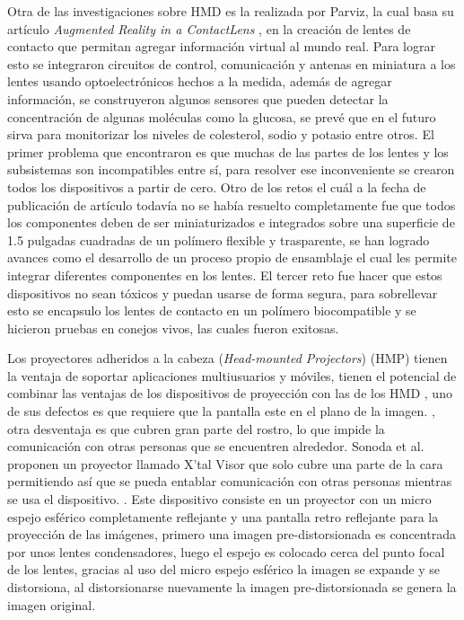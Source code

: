 \documentclass[12pt,a4paper,spanish,openany]{book}
\begin{document}
Otra de las investigaciones sobre HMD es la realizada
por Parviz, la cual basa su artículo \emph{Augmented Reality in a ContactLens}
\cite{arcl}, en la creación de lentes de contacto que permitan agregar
información virtual al mundo real. Para lograr esto se integraron circuitos de
control, comunicación y antenas en miniatura a los lentes usando
optoelectrónicos hechos a la medida, además de agregar información, se
construyeron algunos sensores que pueden detectar la concentración de algunas
moléculas como la glucosa, se prevé que en el futuro sirva para monitorizar los
niveles de colesterol, sodio y potasio entre otros. El primer problema que
encontraron es que muchas de las partes de los lentes y los subsistemas son
incompatibles entre sí, para resolver ese inconveniente se crearon todos los
dispositivos a partir de cero. Otro de los retos el cuál a la fecha de publicación de artículo todavía no se había resuelto completamente fue que
todos los componentes deben de ser miniaturizados e integrados sobre una
superficie de 1.5 pulgadas cuadradas de un polímero flexible y trasparente, se
han logrado avances como el desarrollo de un proceso propio de ensamblaje el
cual les permite integrar diferentes componentes en los lentes. El tercer reto
fue hacer que estos dispositivos no sean tóxicos y puedan usarse de forma
segura, para sobrellevar esto se encapsulo los lentes de contacto en un
polímero biocompatible y se hicieron pruebas en conejos vivos, las cuales
fueron exitosas.




Los proyectores adheridos a la cabeza (\emph{Head-mounted Projectors}) (HMP) 
tienen la ventaja de soportar aplicaciones multiusuarios y móviles, tienen el
potencial de combinar las ventajas de los dispositivos de proyección con las de los HMD \cite{Bimber:2007:MAA:1281500.1281628}, uno de
sus defectos es que requiere que la pantalla este en el plano de la imagen.
\cite{Kjlma:2009:FIP:1549820.1549906}, otra desventaja es que cubren
gran parte del rostro, lo que impide la comunicación con otras personas que se
encuentren alrededor. Sonoda et al. proponen un proyector llamado X'tal Visor
que solo cubre una parte de la cara permitiendo así que se pueda entablar
comunicación con otras personas mientras se usa el dispositivo.
\cite{Sonoda:2005:XFO:1187297.1187330}. Este dispositivo consiste en un
proyector con un micro espejo esférico completamente reflejante y una pantalla
retro reflejante para la proyección de las imágenes, primero una imagen
pre-distorsionada es concentrada por unos lentes condensadores, luego el espejo
es colocado cerca del punto focal de los lentes, gracias al uso del micro
espejo esférico la imagen se expande y se distorsiona, al distorsionarse
nuevamente la imagen pre-distorsionada se genera la imagen original.
\end{document}
